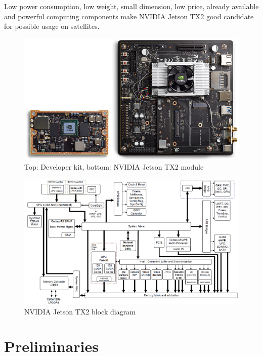 \documentclass[12pt,a4paper,twoside]{article}
\begin{document}
Low power consumption, low weight, small dimension, low price, already available and powerful computing components make NVIDIA Jetson TX2 good candidate for possible usage on satellites.

\begin{figure}[!htbp]
\includegraphics[angle=90, scale=0.7]{NVIDIA_Jetson_TX2_Module_Devkit.png}
\centering
\caption[NVIDIA Jetson TX2 module]{Top: Developer kit, bottom: NVIDIA Jetson TX2 module\cite{nvidia-jetsontx2}}
\label{fig:jetson-image}
\end{figure}

\begin{figure}[!htbp]
\includegraphics[angle=90, scale=0.5]{Tegra_Parker_Block_Diagram-1.png}
\centering
\caption[NVIDIA Jetson TX2 block diagram]{NVIDIA Jetson TX2 block diagram\cite{nvidia-jetsontx2}}
\label{fig:jetson-diagram-image}
\end{figure}


\cleardoublepage
\section{Preliminaries}
\end{document}
